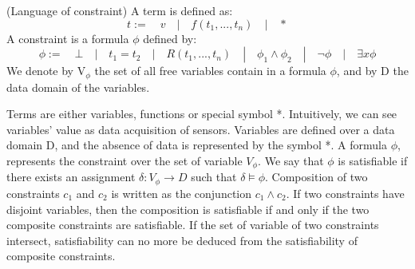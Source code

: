 \begin{definition} (Language of constraint) A term is defined as:
	$$ t := \quad v \quad | \quad f(t_1, ..., t_n) \quad | \quad * $$
	A constraint is a formula $\phi$ defined by:
	$$ \phi := \quad \bot \quad |\quad t_1 = t_2 \quad|\quad R(t_1, ... , t_n) \quad|\quad \phi_1 \land \phi_2 \quad| \quad \neg \phi \quad| \quad \exists x \phi $$
	We denote by V$_{\phi}$ the set of all free variables contain in a formula $\phi$, and by D the data domain of the variables.
\end{definition}


Terms are either variables, functions or special symbol *. Intuitively, we can see variables' value as data acquisition of sensors. Variables are defined over a data domain D, and the absence of data is represented by the symbol *. A formula $\phi$, represents the constraint over the set of variable $V_{\phi}$. We say that $\phi$ is satisfiable if there exists an assignment $\delta : V_{\phi}\rightarrow D$ such that $\delta \models \phi$. Composition of two constraints $c_1$ and $c_2$ is written as the conjunction $c_1 \land c_2$. If two constraints have disjoint variables, then the composition is satisfiable if and only if the two composite constraints are satisfiable. If the set of variable of two constraints intersect, satisfiability can no more be deduced from the satisfiability of composite constraints.